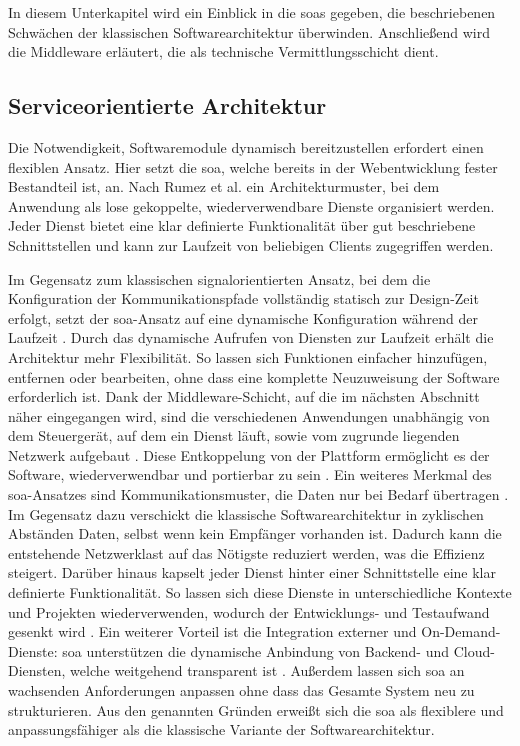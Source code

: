 In diesem Unterkapitel wird ein Einblick in die \glspl{soa} gegeben, die beschriebenen Schwächen der klassischen Softwarearchitektur überwinden. Anschließend wird die Middleware erläutert, die als technische Vermittlungsschicht dient.

\subsection{Serviceorientierte Architektur}
\label{subsect:soa}
Die Notwendigkeit, Softwaremodule dynamisch bereitzustellen erfordert einen flexiblen Ansatz. Hier setzt die \gls{soa}, welche bereits in der Webentwicklung fester Bestandteil ist, an. Nach Rumez et al.\cite{rumezOverviewAutomotiveServiceOriented2020} ein Architekturmuster, bei dem Anwendung als lose gekoppelte, wiederverwendbare Dienste organisiert werden. Jeder Dienst bietet eine klar definierte Funktionalität über gut beschriebene Schnittstellen und kann zur Laufzeit von beliebigen Clients zugegriffen werden.

Im Gegensatz zum klassischen signalorientierten Ansatz, bei dem die Konfiguration der Kommunikationspfade vollständig statisch zur Design-Zeit erfolgt, setzt der \gls{soa}-Ansatz auf eine dynamische Konfiguration während der Laufzeit \cite{rumezOverviewAutomotiveServiceOriented2020}. Durch das dynamische Aufrufen von Diensten zur Laufzeit erhält die Architektur mehr Flexibilität. So lassen sich Funktionen einfacher hinzufügen, entfernen oder bearbeiten, ohne dass eine komplette Neuzuweisung der Software erforderlich ist. Dank der Middleware-Schicht, auf die im nächsten Abschnitt näher eingegangen wird, sind die verschiedenen Anwendungen unabhängig von dem Steuergerät, auf dem ein Dienst läuft, sowie vom zugrunde liegenden Netzwerk aufgebaut \cite{kugeleModelbasedResourceAnalysis2021}. Diese Entkoppelung von der Plattform ermöglicht es der Software, wiederverwendbar und portierbar zu sein \cite{cebotari2020}. Ein weiteres Merkmal des \gls{soa}-Ansatzes sind Kommunikationsmuster, die Daten nur bei Bedarf übertragen \cite{rumezOverviewAutomotiveServiceOriented2020}. Im Gegensatz dazu verschickt die klassische Softwarearchitektur in zyklischen Abständen Daten, selbst wenn kein Empfänger vorhanden ist. Dadurch kann die entstehende Netzwerklast auf das Nötigste reduziert werden, was die Effizienz  steigert. Darüber hinaus kapselt jeder Dienst hinter einer Schnittstelle eine klar definierte Funktionalität. So lassen sich diese Dienste in unterschiedliche Kontexte und Projekten wiederverwenden, wodurch der Entwicklungs- und Testaufwand gesenkt wird \cite{rumezOverviewAutomotiveServiceOriented2020}\cite{cebotari2020}. Ein weiterer Vorteil ist die Integration externer und On-Demand-Dienste: \gls{soa} unterstützen die dynamische Anbindung von Backend- und Cloud-Diensten, welche weitgehend transparent ist \cite{rumezOverviewAutomotiveServiceOriented2020}\cite{henle2022}. Außerdem lassen sich \gls{soa} an wachsenden Anforderungen anpassen ohne dass das Gesamte System neu zu strukturieren. Aus den genannten Gründen erweißt sich die \gls{soa} als flexiblere und anpassungsfähiger als die klassische Variante der Softwarearchitektur.

